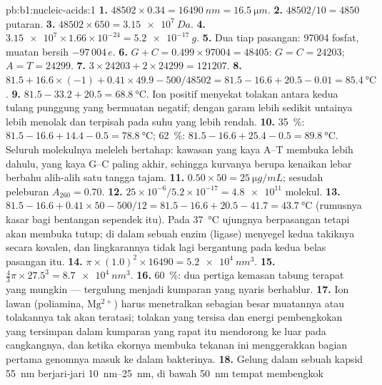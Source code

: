 \begin{solution}{pb:b1:nucleic-acids:1}
\textbf{1.} $\num{48502}\times 0.34 = \qty{16490}{nm} = \qty{16.5}{\micro m}$.
\textbf{2.} $\num{48502}/10 = 4850$ putaran.
\textbf{3.} $\num{48502}\times 650 = \qty{3.15e7}{Da}$.
\textbf{4.} $\num{3.15e7}\times 1.66\times 10^{-24} = \qty{5.2e-17}{g}$.
\textbf{5.} Dua tiap pasangan: \num{97004} fosfat, muatan bersih $-97\,004\,e$.
\textbf{6.} $G + C = 0.499\times\num{97004} = \num{48405}$: $G = C =
\num{24203}$; $A = T = \num{24299}$.
\textbf{7.} $3\times\num{24203} + 2\times\num{24299} = \num{121207}$.
\textbf{8.} $81.5 + 16.6\times(-1) + 0.41\times 49.9 - 500/48502 =
81.5 - 16.6 + 20.5 - 0.01 = \qty{85.4}{\celsius}$.
\textbf{9.} $81.5 - 33.2 + 20.5 = \qty{68.8}{\celsius}$. Ion positif
menyekat tolakan antara kedua tulang punggung yang bermuatan negatif;
dengan garam lebih sedikit untainya lebih menolak dan terpisah pada
suhu yang lebih rendah.
\textbf{10.} \qty{35}{\%}: $81.5 - 16.6 + 14.4 - 0.5 =
\qty{78.8}{\celsius}$; \qty{62}{\%}: $81.5 - 16.6 + 25.4 - 0.5 =
\qty{89.8}{\celsius}$. Seluruh molekulnya meleleh bertahap: kawasan yang
kaya A--T membuka lebih dahulu, yang kaya G--C paling akhir, sehingga
kurvanya berupa kenaikan lebar berbahu alih-alih satu tangga tajam.
\textbf{11.} $0.50\times 50 = \qty{25}{\micro g/mL}$; sesudah peleburan
$A_{260} = 0.70$.
\textbf{12.} $25\times 10^{-6}/5.2\times 10^{-17} = \num{4.8e11}$ molekul.
\textbf{13.} $81.5 - 16.6 + 0.41\times 50 - 500/12 = 81.5 - 16.6 + 20.5
- 41.7 = \qty{43.7}{\celsius}$ (rumusnya kasar bagi bentangan sependek
itu). Pada \qty{37}{\celsius} ujungnya berpasangan tetapi akan membuka
tutup; di dalam  sebuah enzim (ligase) menyegel kedua takiknya
secara kovalen, dan lingkarannya tidak lagi bergantung pada kedua belas
pasangan itu.
\textbf{14.} $\pi\times(1.0)^2\times\num{16490} = \qty{5.2e4}{nm^3}$.
\textbf{15.} $\frac{4}{3}\pi\times 27.5^3 = \qty{8.7e4}{nm^3}$.
\textbf{16.} \qty{60}{\%}: dua pertiga kemasan tabung terapat yang
mungkin ---  tergulung menjadi kumparan yang nyaris berhablur.
\textbf{17.} Ion lawan (poliamina, $\mathrm{Mg^{2+}}$) harus
menetralkan sebagian besar muatannya atau tolakannya tak akan
teratasi; tolakan yang tersisa dan energi pembengkokan yang tersimpan
dalam kumparan yang rapat itu mendorong ke luar pada cangkangnya, dan
ketika ekornya membuka tekanan ini menggerakkan bagian pertama genomnya
masuk ke dalam bakterinya.
\textbf{18.} Gelung dalam sebuah kapsid \qty{55}{nm} berjari-jari
\qtyrange{10}{25}{nm}, di bawah \qty{50}{nm} tempat  membengkok

\end{solution}
